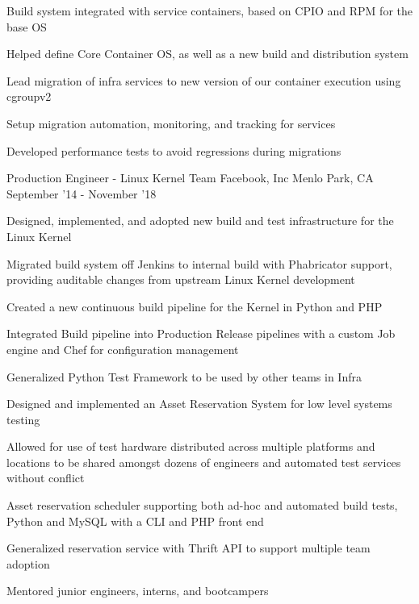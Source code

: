 \begin{cventries}
{\begin{cvitems}
          \item Build system integrated with service containers, based on CPIO and RPM for the base OS
          \item Helped define Core Container OS, as well as a new build and distribution system
		  \item Lead migration of infra services to new version of our container execution using cgroupv2
		  \item Setup migration automation, monitoring, and tracking for services 
		  \item Developed performance tests to avoid regressions during migrations
        \end{cvitems}
    }
\vspace{4mm}
\cventry
    {Production Engineer - Linux Kernel Team} %
    {Facebook, Inc} %
    {Menlo Park, CA} %
    {September '14 - November '18} %
    {
        \begin{cvitems}
          \item Designed, implemented, and adopted new build and test infrastructure for the Linux Kernel
          \item Migrated build system off Jenkins to internal build with Phabricator support, providing auditable changes from upstream Linux Kernel development
          \item Created a new continuous build pipeline for the Kernel in Python and PHP 
          \item Integrated Build pipeline into Production Release pipelines with a custom Job engine and Chef for configuration management
          \item Generalized Python Test Framework to be used by other teams in Infra
          \item Designed and implemented an Asset Reservation System for low level systems testing
          \item Allowed for use of test hardware distributed across multiple platforms and locations to be shared amongst dozens of engineers and automated test services without conflict 
          \item Asset reservation scheduler supporting both ad-hoc and automated build tests, Python and MySQL with a CLI and PHP front end
          \item Generalized reservation service with Thrift API to support multiple team adoption
          \item Mentored junior engineers, interns, and bootcampers
        \end{cvitems}
}
\end{cventries}
